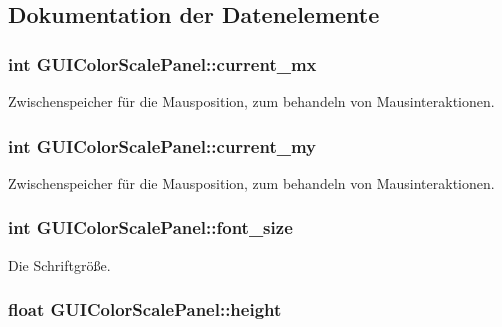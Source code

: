 \subsection{Dokumentation der Datenelemente}
\hypertarget{classGUIColorScalePanel_ab3da81e6c3cfb9122c0291584276a54d}{
\subsubsection[{current\-\_\-mx}]{\setlength{\rightskip}{0pt plus 5cm}int G\-U\-I\-Color\-Scale\-Panel\-::current\-\_\-mx\hspace{0.3cm}{\ttfamily [private]}}}\label{classGUIColorScalePanel_ab3da81e6c3cfb9122c0291584276a54d}
Zwischenspeicher für die Mausposition, zum behandeln von Mausinteraktionen. \hypertarget{classGUIColorScalePanel_abb73679c805d8bcdd1ca0cb602887f84}{
\subsubsection[{current\-\_\-my}]{\setlength{\rightskip}{0pt plus 5cm}int G\-U\-I\-Color\-Scale\-Panel\-::current\-\_\-my\hspace{0.3cm}{\ttfamily [private]}}}\label{classGUIColorScalePanel_abb73679c805d8bcdd1ca0cb602887f84}
Zwischenspeicher für die Mausposition, zum behandeln von Mausinteraktionen. \hypertarget{classGUIColorScalePanel_acd79c1dedc939040b03f54f21e78d72f}{
\subsubsection[{font\-\_\-size}]{\setlength{\rightskip}{0pt plus 5cm}int G\-U\-I\-Color\-Scale\-Panel\-::font\-\_\-size\hspace{0.3cm}{\ttfamily [private]}}}\label{classGUIColorScalePanel_acd79c1dedc939040b03f54f21e78d72f}
Die Schriftgröße. \hypertarget{classGUIColorScalePanel_a5bbc9ff741f566a75f757e54324dac5a}{
\subsubsection[{height}]{\setlength{\rightskip}{0pt plus 5cm}float G\-U\-I\-Color\-Scale\-Panel\-::height\hspace{0.3cm}{\ttfamily [private]}}}\label{classGUIColorScalePanel_a5bbc9ff741f566a75f757e54324dac5a}
